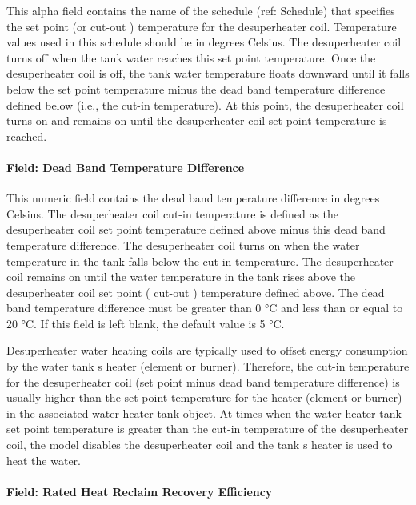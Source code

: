 This alpha field contains the name of the schedule (ref: Schedule) that specifies the set point (or cut-out ) temperature for the desuperheater coil. Temperature values used in this schedule should be in degrees Celsius. The desuperheater coil turns off when the tank water reaches this set point temperature. Once the desuperheater coil is off, the tank water temperature floats downward until it falls below the set point temperature minus the dead band temperature difference defined below (i.e., the cut-in temperature). At this point, the desuperheater coil turns on and remains on until the desuperheater coil set point temperature is reached.

\paragraph{Field: Dead Band Temperature Difference}\label{field-dead-band-temperature-difference}

This numeric field contains the dead band temperature difference in degrees Celsius. The desuperheater coil cut-in temperature is defined as the desuperheater coil set point temperature defined above minus this dead band temperature difference. The desuperheater coil turns on when the water temperature in the tank falls below the cut-in temperature. The desuperheater coil remains on until the water temperature in the tank rises above the desuperheater coil set point ( cut-out ) temperature defined above. The dead band temperature difference must be greater than 0 °C and less than or equal to 20 °C. If this field is left blank, the default value is 5 °C.

Desuperheater water heating coils are typically used to offset energy consumption by the water tank s heater (element or burner). Therefore, the cut-in temperature for the desuperheater coil (set point minus dead band temperature difference) is usually higher than the set point temperature for the heater (element or burner) in the associated water heater tank object. At times when the water heater tank set point temperature is greater than the cut-in temperature of the desuperheater coil, the model disables the desuperheater coil and the tank s heater is used to heat the water.

\paragraph{Field: Rated Heat Reclaim Recovery Efficiency}\label{field-rated-heat-reclaim-recovery-efficiency}

